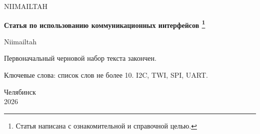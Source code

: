 \thispagestyle{empty}
\begin{Titul}
{
    \begin{center}
        NIIMAILTAH \\
    \end{center}
    \vspace{8em}

    \bf{Статья по использованию коммуникационных интерфейсов}
    \footnote{Статья написана с ознакомительной и справочной целью.}
    \\[4ex]
    \begin{flushright}
    Niimailtah
    \end{flushright}
}
\end{Titul}    
\vspace{4em}
\begin{Anot}
    Первоначальный черновой набор текста закончен.
    
    Ключевые слова: список слов не более 10.
    I2C, TWI, SPI, UART.
\end{Anot}

\vspace{\fill}

\begin{center}
    Челябинск \\2026
\end{center}

